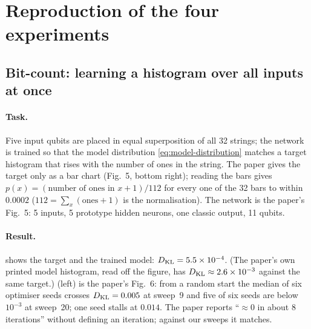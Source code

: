 \section{Reproduction of the four experiments}
\label{sec:reproduction}

\subsection{Bit-count: learning a histogram over all inputs at once}
\label{sec:bitcount}

\paragraph{Task.}
Five input qubits are placed in equal superposition of all 32 strings; the network is trained so
that the model distribution \cref{eq:model-distribution} matches a target histogram that rises
with the number of ones in the string.  The paper gives the target only as a bar chart
(Fig.~5, bottom right); reading the bars gives $p(x) = (\text{number of ones in } x + 1)/112$
for every one of the 32 bars to within $0.0002$ ($112 = \sum_x (\text{ones}+1)$ is the
normalisation).  The network is the paper's Fig.~5: 5 inputs, 5 prototype hidden neurons, one
classic output, 11 qubits.

\paragraph{Result.}
 shows the target and the trained model: $D_{\mathrm{KL}} = 5.5\times10^{-4}$.  (The
paper's own printed model histogram, read off the figure, has $D_{\mathrm{KL}}\approx 2.6\times10^{-3}$
against the same target.)   (left) is the paper's Fig.~6: from a random
start the median of six optimiser seeds crosses $D_{\mathrm{KL}} = 0.005$ at sweep~9 and five of six seeds
are below $10^{-3}$ at sweep~20; one seed stalls at $0.014$.  The paper reports ``$\approx 0$ in
about 8 iterations'' without defining an iteration; against our sweeps it matches.


